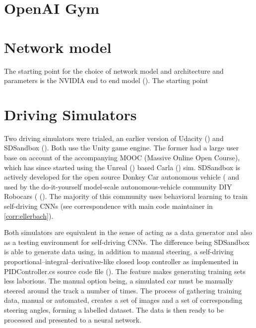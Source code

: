 \section{OpenAI Gym}



\section{Network model}

The starting point for the choice of network model and architecture and parameters is the NVIDIA end to end model (\cite{bojarski2016end}).
The starting point

\section{Driving Simulators}

Two driving simulators were trialed, an earlier version of Udacity (\cite{UdacityCarSim}) and SDSandbox (\cite{SDSandboxSim}). Both use the Unity game engine. The former had a large user base on account of the accompanying MOOC (Massive Online Open Course), which has since started using the Unreal (\cite{unrealengine}) based Carla (\cite{Dosovitskiy17}) sim. SDSandbox is actively developed for the open source Donkey Car autonomous vehicle (\cite{DonkeyCar2020} and used by the do-it-yourself model-scale autonomous-vehicle community DIY Robocars (\cite{DIYRobocars2020} (\cite{DIYRobocars2020}). The majority of this community uses behavioral learning to train self-driving CNNs (see correspondence with main code maintainer in \ref{corr:ellerbach}).  
 
Both simulators are equivalent in the sense of acting as a data generator and also as a testing environment for self-driving CNNs. The difference being SDSandbox is able to generate data using, in addition to manual steering, a self-driving proportional–integral–derivative-like closed loop controller as implemented in PIDController.cs source code file (\cite{SDSandboxSim}). The feature makes generating training sets less laborious. The manual option being, a simulated car must be manually steered around the track a number of times. The process of gathering training data, manual or automated, creates a set of images and a set of corresponding steering angles, forming a labelled dataset.
The data is then ready to be processed and presented to a neural network.

